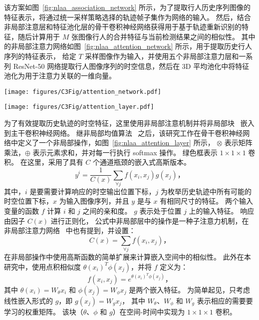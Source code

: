 该方案如图~\ref{fig:nlaa_association_network} 所示，为了提取行人历史序列图像的特征表示，将通过统一采样策略选择的轨迹帧子集作为网络的输入。 
然后，结合非局部注意层和特征池化层的骨干卷积神经网络获得用于基于轨迹重新识别的特征，随后计算用于 $ M $ 张图像行人的合并特征与当前检测结果之间的相似性。
其中的非局部注意力网络如图~\ref{fig:nlaa_attention_network} 所示，用于提取历史行人序列的特征表示，
给定 $T$ 采样图像作为输入，并使用五个非局部注意力层和一系列 ResNet-50 网络提取行人图像序列的时空信息，然后在 3D 平均池化中将特征池化为用于注意力关联的一维向量。

\begin{figure*}[ht]
	\centering
	\texttt{[image: figures/C3Fig/attention\_network.pdf]}
	\caption{非局部注意力网络的详细描述}
	\label{fig:nlaa_attention_network}
\end{figure*}


\begin{figure*}[ht]
	\centering
	\texttt{[image: figures/C3Fig/attention\_layer.pdf]}
	\caption{非局部注意力层的细节}
	\label{fig:nlaa_attention_layer}
\end{figure*}

为了有效提取历史轨迹的时空特征，这里使用非局部注意机制并将非局部块~\cite{b37} 嵌入到主干卷积神经网络。
继非局部均值算法~\cite{b30} 之后，该研究工作在骨干卷积神经网络中定义了一个非局部操作，如图~\ref{fig:nlaa_attention_layer} 所示，
$\otimes$ 表示矩阵乘法，$\oplus$ 表示元素求和，并对每一行执行 softmax 操作。 
绿色框表示 $1 \times 1 \times1$ 卷积。 
在这里，采用了具有 $C$ 个通道瓶颈的嵌入式高斯版本。
\begin{equation}
y^i=\frac{1}{C\left( x \right)} \sum_{\forall j}  f{\left( x_i,x_j \right) g\left( x_j \right) }\mbox{，}
\label{nonlocal_operation}
\end{equation}
其中，$i$ 是要需要计算响应的时空输出位置下标，$j$ 为枚举历史轨迹中所有可能的时空位置下标，$x$ 为输入图像序列，并且 $y$ 是与 $ x $ 有相同尺寸的特征。 
两个输入变量的函数 $f$ 计算 $i$ 和 $j$ 之间的亲和度。
$g$ 表示处于位置 $j$ 上的输入特征。
响应由因子 $ C\left(x\right) $ 进行正则化，
公式中非局部层中的操作是一种子注意力机制，在非局部注意力网络~\cite{b37} 中也有提到，并设置：
\begin{equation}
C\left(x\right)=\sum_{\forall j}f\left(x_i,x_j\right)\mbox{，}
\end{equation}
在非局部操作中使用高斯函数的简单扩展来计算嵌入空间中的相似性。
此外在本研究中，使用点积相似度 $\theta \left(x_i\right)^T \phi \left(x_j\right)$，并将 $f$ 定义为：
\begin{equation}
f\left(x_i,x_j\right)=e^{ \theta \left(x_i\right)^T \phi \left(x_j\right) }\mbox{，}
\end{equation}
其中 $ \theta \left(x_i\right) = W_\theta x_i $ 和 $ \phi \left(x_j\right)=W_\phi x_j $ 是两个嵌入特征。
为简单起见，只考虑线性嵌入形式的 $g$，即 $g\left(x_j\right) = W_g x_j $，
其中 $W_\theta$、$W_\phi$ 和 $W_g $ 表示相应的需要要学习的权重矩阵。 
该块（$\theta$、$\phi$ 和 $g$）在空间-时间中实现为 $1 \times 1 \times 1$ 卷积。

